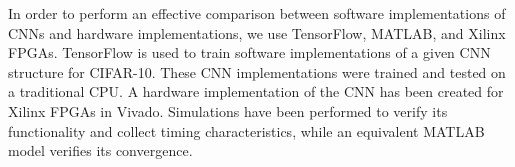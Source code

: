 In order to perform an effective comparison between software implementations of CNNs and hardware implementations, we use TensorFlow, MATLAB, and Xilinx FPGAs. TensorFlow is used to train software implementations of a given CNN structure for CIFAR-10. These CNN implementations were trained and tested on a traditional CPU. A hardware implementation of the CNN has been created for Xilinx FPGAs in Vivado. Simulations have been performed to verify its functionality and collect timing characteristics, while an equivalent MATLAB model verifies its convergence.